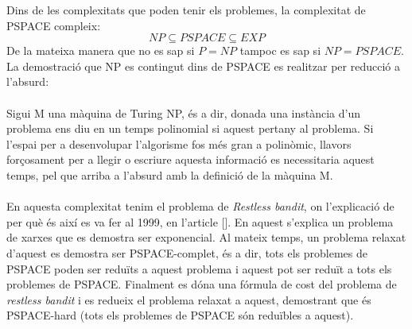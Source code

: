 
	Dins de les complexitats que poden tenir els problemes, la complexitat de PSPACE compleix:
	\[
	{NP} \subseteq PSPACE \subseteq {EXP} %
	\]
	De la mateixa manera que no es sap si $P = NP$ tampoc es sap si $NP = PSPACE$. La demostració que NP es contingut dins de
	PSPACE es realitzar per reducció a l'absurd:\\
	\\
	 Sigui M una màquina de Turing NP, és a dir, donada una instància d'un problema ens diu en un temps 
	polinomial si aquest pertany al problema. Si l'espai per a desenvolupar l'algorisme fos més gran a polinòmic, llavors forçosament
	per a llegir o escriure aquesta informació es necessitaria aquest temps, pel que arriba a l'absurd amb la definició de la màquina M. %
	\\
	\\
	En aquesta complexitat tenim el problema de \textit{Restless bandit}, on l'explicació de per què és així es va fer al 1999, en 
	l'article [].%
	En aquest s'explica un problema de xarxes que es demostra ser exponencial. Al mateix temps, un problema relaxat d'aquest
	es demostra ser PSPACE-complet, és a dir, tots els problemes de PSPACE poden ser reduïts a aquest problema i aquest pot
	ser reduït a tots els problemes de PSPACE. Finalment es dóna una fórmula de cost del problema de \textit{restless bandit} i
	es redueix el problema relaxat a aquest, demostrant que és PSPACE-hard (tots els problemes de PSPACE són
	reduïbles a aquest). %
	
